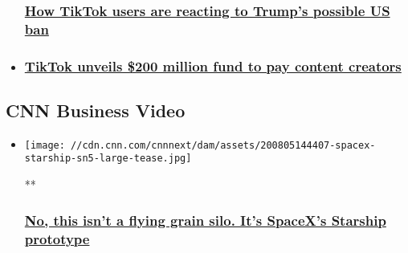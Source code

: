 \begin{itemize}
{  \subsubsection{\texorpdfstring{\href{/2020/08/01/tech/tiktok-ban-reactions/index.html}{How
  TikTok users are reacting to Trump's possible US
  ban}}{How TikTok users are reacting to Trump's possible US ban}}\label{how-tiktok-users-are-reacting-to-trumps-possible-us-ban}}
\item
  \hypertarget{tiktok-unveils-200-million-fund-to-pay-content-creators-}{%
  \subsubsection{\texorpdfstring{\href{/2020/07/23/tech/tiktok-creators-fund/index.html}{TikTok
  unveils \$200 million fund to pay content creators
  }}{TikTok unveils \$200 million fund to pay content creators }}\label{tiktok-unveils-200-million-fund-to-pay-content-creators-}}
\end{itemize}

\hypertarget{cnn-business-video-}{%
\subsection{CNN Business Video~}\label{cnn-business-video-}}

\begin{itemize}
\item
  \href{/videos/business/2020/08/05/spacex-starship-elon-musk-hop-test-sn5-orig.cnn-business}{}

  \texttt{[image: //cdn.cnn.com/cnnnext/dam/assets/200805144407-spacex-starship-sn5-large-tease.jpg]}

  **

  \hypertarget{no-this-isnt-a-flying-grain-silo-its-spacexs-starship-prototype}{%
  \subsubsection{\texorpdfstring{\href{/videos/business/2020/08/05/spacex-starship-elon-musk-hop-test-sn5-orig.cnn-business}{No,
  this isn't a flying grain silo. It's SpaceX's Starship
  prototype}}{No, this isn't a flying grain silo. It's SpaceX's Starship prototype}}\label{no-this-isnt-a-flying-grain-silo-its-spacexs-starship-prototype}}
\end{itemize}

\href{/videos/business/2020/07/28/virgin-galactic-cabin-spaceship-vr-orig-bl.cnn}{}

